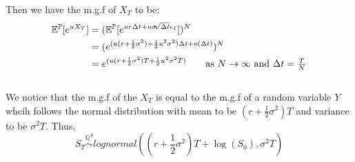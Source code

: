 \documentclass[12pt, letterpaper]{article}
\begin{document}
Then we have the m.g.f of $X_T$ to be:
\begin{align*}
  \mathbb{E}^\mathbb{P}[e^{u X_T}] &= (\mathbb{E}^\mathbb{P} [e^{u r\Delta t+u\sigma \sqrt[]{\Delta t} \epsilon_1}])^N \\
  &= (e^{(u(r+\frac{1}{2}\sigma^2) + \frac{1}{2}u^2\sigma^2) \Delta t + o(\Delta t)})^N\\
  &= e^{(u(r + \frac{1}{2}\sigma^2)T + \frac{1}{2}u^2 \sigma^2T)} \tag*{as $N \rightarrow \infty$ and $\Delta t = \frac{T}{N}$}
\end{align*}
\\
We notice that the m.g.f of the $X_T$ is equal to the m.g.f of a random variable $Y$ whcih follows the normal distribution with mean to be $(r + \frac{1}{2}\sigma^2)T$ and
variance to be $\sigma^2 T$. Thus, 
\[ S_T \stackrel{\mathbb{Q}^S}{\sim} lognormal((r + \frac{1}{2}\sigma^2)T + \log(S_0), \sigma^2 T)\]
\end{document}
